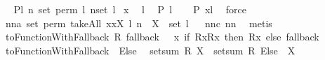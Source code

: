 \begin{isabellebody}
\ \isamarkupfalse%
\ {\isacharquery}P{\isacharequal}{\isachardoublequoteopen}{\isacharpercent}l{\isachardot}\ {\isacharparenleft}{\isasymforall}n{\isachardot}\ set\ {\isacharparenleft}perm{}\ l\ n{\isacharparenright}{\isacharequal}set\ l{\isacharparenright}{\isachardoublequoteclose}\isanewline
{}\isamarkupfalse%
\ x\ \isamarkupfalse%
\ l\ \isamarkupfalse%
\ {\isachardoublequoteopen}{\isacharquery}P\ l{\isachardoublequoteclose}\ \isamarkupfalse%
\ \isamarkupfalse%
\ {\isachardoublequoteopen}{\isacharquery}P\ {\isacharparenleft}x{\isacharhash}l{\isacharparenright}{\isachardoublequoteclose}\ \isamarkupfalse%
\ force\isanewline
{}\isamarkupfalse%
%
\endisatagproof
{\isafoldproof}%
%
\isadelimproof
\isanewline
%
\endisadelimproof
\isanewline
{}\isamarkupfalse%
\ nn{}{}a{\isacharcolon}\ {\isachardoublequoteopen}set\ {\isacharparenleft}perm{}\ {\isacharparenleft}takeAll\ {\isacharparenleft}{\isacharpercent}x{\isachardot}{\isacharparenleft}x{\isasymin}X{\isacharparenright}{\isacharparenright}\ l{\isacharparenright}\ n{\isacharparenright}\ {\isasymsubseteq}\ X\ {\isasyminter}\ set\ l{\isachardoublequoteclose}%
\isadelimproof
\ %
\endisadelimproof
%
\isatagproof
{}\isamarkupfalse%
\ nn{}{}c\ nn{}{}\ \isamarkupfalse%
\ metis%
\endisatagproof
{\isafoldproof}%
%
\isadelimproof
%
\endisadelimproof
%
\isamarkuptrue%
\isamarkupfalse%
\ {\isachardoublequoteopen}toFunctionWithFallback\ R\ fallback\ {\isacharequal}{\isacharequal}\ {\isacharparenleft}{\isacharpercent}\ x{\isachardot}\ if\ {\isacharparenleft}R{\isacharbackquote}{\isacharbackquote}{\isacharbraceleft}x{\isacharbraceright}{\isacharequal}{\isacharbraceleft}R{\isacharcomma}{\isacharcomma}x{\isacharbraceright}{\isacharparenright}\ then\ {\isacharparenleft}R{\isacharcomma}{\isacharcomma}x{\isacharparenright}\ else\ fallback{\isacharparenright}{\isachardoublequoteclose}\isanewline
{}\isamarkupfalse%
\ toFunctionWithFallback\ {\isacharparenleft}\ {\isachardoublequoteopen}Else{\isachardoublequoteclose}\ {}{}{\isacharparenright}\isanewline
{}\isamarkupfalse%
\ {\isachardoublequoteopen}setsum{\isacharprime}\ R\ X\ {\isacharequal}{\isacharequal}\ setsum\ {\isacharparenleft}R\ Else\ {}{\isacharparenright}\ X{\isachardoublequoteclose}\isanewline

\end{isabellebody}
